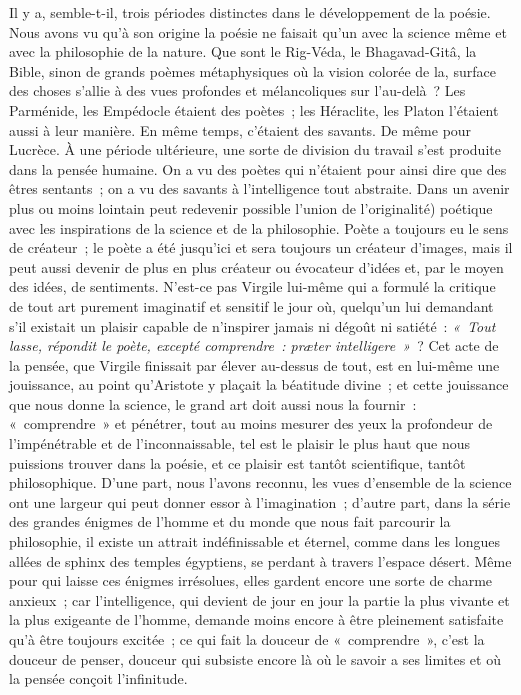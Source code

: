 \documentclass[french,twoside]{book} %
\newcommand\foreign[1]{\emph{#1}}
\begin{document}
Il y a, semble-t-il, trois périodes distinctes dans le développement de la poésie. Nous avons vu qu’à son origine la poésie ne faisait qu’un avec la science même et avec la philosophie de la nature. Que sont le Rig-Véda, le Bhagavad-Gitâ, la Bible, sinon de grands poèmes métaphysiques où la vision colorée de la, surface des choses s’allie à des vues profondes et mélancoliques sur l’au-delà ? Les Parménide, les Empédocle étaient des poètes ; les Héraclite, les Platon l’étaient aussi à leur manière. En même temps, c’étaient des savants. De même pour Lucrèce. À une période ultérieure, une sorte de division du travail s’est produite dans la pensée humaine. On a vu des poètes qui n’étaient pour ainsi dire que des êtres sentants ; on a vu des savants à l’intelligence tout abstraite. Dans un avenir plus ou moins lointain peut redevenir possible l’union de l’originalité)  poétique avec les inspirations de la science et de la philosophie. Poète a toujours eu le sens de créateur ; le poète a été jusqu’ici et sera toujours un créateur d’images, mais il peut aussi devenir de plus en plus créateur ou évocateur d’idées et, par le moyen des idées, de sentiments. N’est-ce pas Virgile lui-même qui a formulé la critique de tout art purement imaginatif et sensitif le jour où, quelqu’un lui demandant s’il existait un plaisir capable de n’inspirer jamais ni dégoût ni satiété : \emph{« Tout lasse, répondit le poète, excepté comprendre : \foreign{\emph{præter intelligere}} »} ? Cet acte de la pensée, que Virgile finissait par élever au-dessus de tout, est en lui-même une jouissance, au point qu’Aristote y plaçait la béatitude divine ; et cette jouissance que nous donne la science, le grand art doit aussi nous la fournir : « comprendre » et pénétrer, tout au moins mesurer des yeux la profondeur de l’impénétrable et de l’inconnaissable, tel est le plaisir le plus haut que nous puissions trouver dans la poésie, et ce plaisir est tantôt scientifique, tantôt philosophique. D’une part, nous l’avons reconnu, les vues d’ensemble de la science ont une largeur qui peut donner essor à l’imagination ; d’autre part, dans la série des grandes énigmes de l’homme et du monde que nous fait parcourir la philosophie, il existe un attrait indéfinissable et éternel, comme dans les longues allées de sphinx des temples égyptiens, se perdant à travers l’espace désert. Même pour qui laisse ces énigmes irrésolues, elles gardent encore une sorte de charme anxieux ; car l’intelligence, qui devient de jour en jour la partie la plus vivante et la plus exigeante de l’homme, demande moins encore  à être pleinement satisfaite qu’à être toujours excitée ; ce qui fait la douceur de « comprendre », c’est la douceur de penser, douceur qui subsiste encore là où le savoir a ses limites et où la pensée conçoit l’infinitude.
\end{document}
